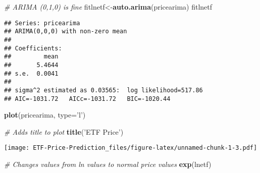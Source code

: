 \documentclass[
]{article}
\newenvironment{Shaded}{\begin{snugshade}}{\end{snugshade}}
\newcommand{\CommentTok}[1]{\textcolor[rgb]{0.56,0.35,0.01}{\textit{#1}}}
\newcommand{\DataTypeTok}[1]{\textcolor[rgb]{0.13,0.29,0.53}{#1}}
\newcommand{\KeywordTok}[1]{\textcolor[rgb]{0.13,0.29,0.53}{\textbf{#1}}}
\newcommand{\NormalTok}[1]{#1}
\newcommand{\StringTok}[1]{\textcolor[rgb]{0.31,0.60,0.02}{#1}}
\begin{document}
\begin{Shaded}
\begin{Highlighting}[]
    \CommentTok{# ARIMA (0,1,0) is fine}
\NormalTok{      fitlnetf<-}\KeywordTok{auto.arima}\NormalTok{(pricearima)}
\NormalTok{      fitlnetf}
\end{Highlighting}
\end{Shaded}

\begin{verbatim}
## Series: pricearima 
## ARIMA(0,0,0) with non-zero mean 
## 
## Coefficients:
##         mean
##       5.4644
## s.e.  0.0041
## 
## sigma^2 estimated as 0.03565:  log likelihood=517.86
## AIC=-1031.72   AICc=-1031.72   BIC=-1020.44
\end{verbatim}

\begin{Shaded}
\begin{Highlighting}[]
      \KeywordTok{plot}\NormalTok{(pricearima, }\DataTypeTok{type=}\StringTok{'l'}\NormalTok{)}
      
    \CommentTok{# Adds title to plot}
      \KeywordTok{title}\NormalTok{(}\StringTok{'ETF Price'}\NormalTok{)}
\end{Highlighting}
\end{Shaded}

\texttt{[image: ETF-Price-Prediction\_files/figure-latex/unnamed-chunk-1-3.pdf]}

\begin{Shaded}
\begin{Highlighting}[]
    \CommentTok{# Changes values from ln values to normal price values}
      \KeywordTok{exp}\NormalTok{(lnetf)}
\end{Highlighting}
\end{Shaded}
\end{document}
